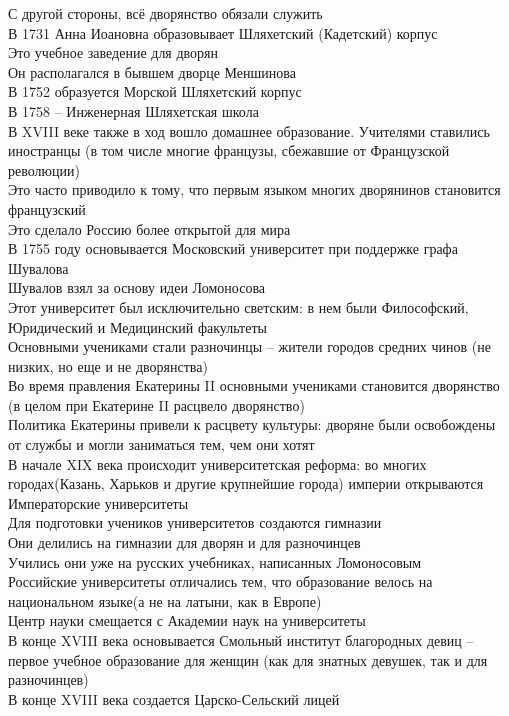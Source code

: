 \documentclass[12pt]{article}
\begin{document}
С другой стороны, всё дворянство обязали служить\\
В 1731 Анна Иоановна образовывает Шляхетский (Кадетский) корпус\\
Это учебное заведение для дворян\\
Он располагался в бывшем дворце Меншинова\\
В 1752 образуется Морской Шляхетский корпус\\
В 1758 -- Инженерная Шляхетская школа\\
В XVIII веке также в ход вошло домашнее образование. Учителями ставились иностранцы (в том числе многие французы, сбежавшие от Французской революции)\\
Это часто приводило к тому, что первым языком многих дворянинов становится французский\\
Это сделало Россию более открытой для мира\\
В 1755 году основывается Московский университет при поддержке графа Шувалова\\
Шувалов взял за основу идеи Ломоносова\\
Этот университет был исключительно светским: в нем были Философский, Юридический и Медицинский факультеты\\
Основными учениками стали разночинцы -- жители городов средних чинов (не низких, но еще и не дворянства)\\
Во время правления Екатерины II основными учениками становится дворянство (в целом при Екатерине II расцвело дворянство)\\
Политика Екатерины привели к расцвету культуры: дворяне были освобождены от службы и могли заниматься тем, чем они хотят\\
В начале XIX века происходит университетская реформа: во многих городах(Казань, Харьков и другие крупнейшие города) империи открываются Императорские университеты\\
Для подготовки учеников университетов создаются гимназии\\
Они делились на гимназии для дворян и для разночинцев\\
Учились они уже на русских учебниках, написанных Ломоносовым\\
Российские университеты отличались тем, что образование велось на национальном языке(а не на латыни, как в Европе)\\
Центр науки смещается с Академии наук на университеты\\
В конце XVIII века основывается Смольный институт благородных девиц -- первое учебное образование для женщин (как для знатных девушек, так и для разночинцев)\\
В конце XVIII века создается Царско-Сельский лицей\\
\end{document}
